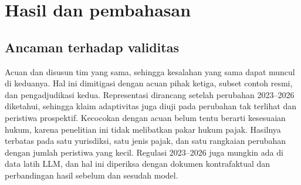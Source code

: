 \section{Hasil dan pembahasan}
\label{sec:hasil}


\subsection{Ancaman terhadap validitas}
Acuan dan  disusun tim yang sama, sehingga kesalahan yang sama dapat muncul di keduanya. Hal ini dimitigasi dengan acuan pihak ketiga, subset  contoh resmi, dan pengadjudikasi kedua. Representasi dirancang setelah perubahan 2023--2026 diketahui, sehingga klaim adaptivitas juga diuji pada perubahan tak terlihat dan peristiwa prospektif. Kecocokan dengan acuan belum tentu berarti kesesuaian hukum, karena penelitian ini tidak melibatkan pakar hukum pajak. Hasilnya terbatas pada satu yurisdiksi, satu jenis pajak, dan satu rangkaian perubahan dengan jumlah peristiwa yang kecil. Regulasi 2023--2026 juga mungkin ada di data latih LLM, dan hal ini diperiksa dengan dokumen kontrafaktual dan perbandingan hasil sebelum dan sesudah  model.

